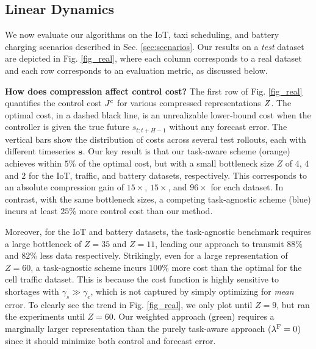 \subsection{Linear Dynamics}
\label{subsec:linear}



We now evaluate our algorithms on the IoT, taxi scheduling, and battery charging scenarios described in Sec. \ref{sec:scenarios}. Our results on a \textit{test} dataset are depicted in Fig. \ref{fig_real}, where each column corresponds to a real dataset and each row corresponds to an evaluation metric, as discussed below.

\textbf{How does compression affect control cost?} The first row of Fig. \ref{fig_real} quantifies the control cost $J^{\mathrm{c}}$ for various compressed representations $Z$. The optimal cost, in a dashed black line, is an unrealizable lower-bound cost when the controller is given the true future $s_{t:t+H-1}$ without any forecast error. The vertical bars show the distribution of costs across several test rollouts, each with different timeseries $\bold{s}$. 
Our key result is that our task-aware scheme (orange) achieves within $5 \%$ of the optimal cost, but with a small bottleneck size $Z$ of $4$, $4$ and $2$ for the IoT, traffic, and battery datasets, respectively. This corresponds to an absolute compression gain of $15\times$, $15\times$, and $96\times$ for each dataset. In contrast, with the same bottleneck sizes, a competing task-agnostic scheme (blue) incurs at least $25\%$ more control cost than our method.

Moreover, for the IoT and battery datasets, the task-agnostic benchmark requires a large bottleneck of $Z=35$ and $Z=11$, leading our approach to transmit $88 \%$ and $82 \%$ less data respectively. Strikingly, even for a large representation of $Z = 60$, a task-agnostic scheme incurs $100\%$ more cost than the optimal for the cell traffic dataset. This is because the cost function is highly sensitive to shortages with $\gamma_s \gg \gamma_e$, which is not captured by simply optimizing for \textit{mean} error. To clearly see the trend in Fig. \ref{fig_real}, we only plot until $Z=9$, but ran the experiments until $Z=60$. Our weighted approach (green) requires a marginally larger representation than the purely task-aware approach ($\lambda^{\mathrm{F}} = 0$) since it should minimize both control and forecast error. 

